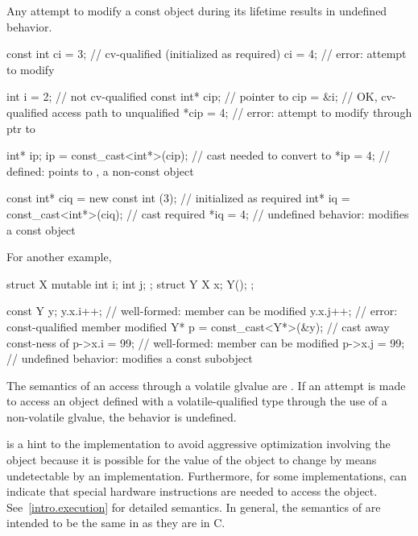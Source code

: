 \pnum
{}%
Any attempt to modify a
const object during its
lifetime results in undefined behavior.
\begin{example}
\begin{codeblock}
const int ci = 3;                       // cv-qualified (initialized as required)
ci = 4;                                 // error: attempt to modify 

int i = 2;                              // not cv-qualified
const int* cip;                         // pointer to 
cip = &i;                               // OK, cv-qualified access path to unqualified
*cip = 4;                               // error: attempt to modify through ptr to 

int* ip;
ip = const_cast<int*>(cip);             // cast needed to convert  to 
*ip = 4;                                // defined:  points to , a non-const object

const int* ciq = new const int (3);     // initialized as required
int* iq = const_cast<int*>(ciq);        // cast required
*iq = 4;                                // undefined behavior: modifies a const object
\end{codeblock}
For another example,
\begin{codeblock}
struct X {
  mutable int i;
  int j;
};
struct Y {
  X x;
  Y();
};

const Y y;
y.x.i++;                                // well-formed:  member can be modified
y.x.j++;                                // error: const-qualified member modified
Y* p = const_cast<Y*>(&y);              // cast away const-ness of 
p->x.i = 99;                            // well-formed:  member can be modified
p->x.j = 99;                            // undefined behavior: modifies a const subobject
\end{codeblock}
\end{example}

\pnum
The semantics of an access through a volatile glvalue are
.
If an attempt is made to access an object defined with a
volatile-qualified type through the use of a non-volatile glvalue,
the behavior is undefined.

\pnum
{}%
%
\begin{note}
 is a hint to the implementation to avoid aggressive
optimization involving the object because it is possible for the value of the object
to change by means undetectable by an implementation.
Furthermore, for some implementations,  can indicate that
special hardware instructions are needed to access the object.
See~\ref{intro.execution} for detailed semantics. In general, the
semantics of  are intended to be the same in \Cpp{} as
they are in C.
\end{note}

